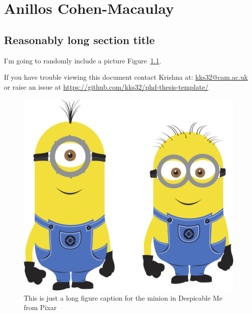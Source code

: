 
\chapter{Anillos Cohen-Macaulay}

\ifpdf
    \graphicspath{{CohenMacaulay/Figs/Raster/}{CohenMacaulay/Figs/PDF/}{CohenMacaulay/Figs/}}
\else
    \graphicspath{{CohenMacaulay/Figs/Vector/}{CohenMacaulay/Figs/}}
\fi


\section[Short title]{Reasonably long section title}

I'm going to randomly include a picture Figure~\ref{fig:minion}.


If you have trouble viewing this document contact Krishna at: \href{mailto:kks32@cam.ac.uk}{kks32@cam.ac.uk} or raise an issue at \url{https://github.com/kks32/phd-thesis-template/}


\begin{figure}[htbp!] 
\centering    
\includegraphics[width=1.0\textwidth]{minion}
\caption[Minion]{This is just a long figure caption for the minion in Despicable Me from Pixar}
\label{fig:minion}
\end{figure}


